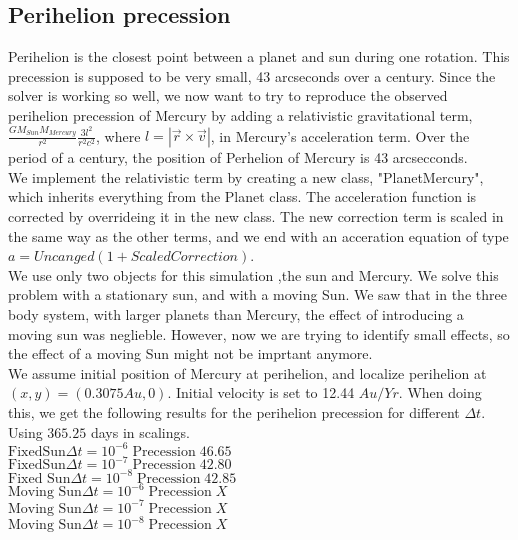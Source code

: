 \documentclass{article}
\begin{document}
\subsection{Perihelion precession}
Perihelion is the closest point between a planet and sun during one rotation. This precession is supposed to be very small, 43 arcseconds over a century. Since the solver is working so well, we now want to try to reproduce the observed perihelion precession of Mercury by adding a relativistic gravitational term,$\frac{GM_{Sun} M_{Mercury}}{r^2} \frac{3l^2}{r^2c^2}$, where $l = |\vec{r} \times \vec{v}|$, in Mercury's acceleration term. Over the period of a century, the position of Perhelion of Mercury is 43 arcsecconds. \\

We implement the relativistic term by creating a new class, "PlanetMercury", which inherits everything from the Planet class. The acceleration function is corrected by overrideing it in the new class. The new correction term is scaled in the same way as the other terms, and we  end with an acceration equation of type $a = Uncanged(1 + ScaledCorrection)$. \\

We use only two objects for this simulation ,the sun and Mercury. We solve this problem with a stationary sun, and with a moving Sun. We saw that in the three body system, with larger planets than Mercury, the effect of introducing a moving sun was neglieble. However, now we are trying to identify small effects, so the effect of a moving Sun might not be imprtant anymore. \\

We assume initial position of Mercury at perihelion, and localize perihelion at $(x,y) = (0.3075 Au, 0)$. Initial velocity is set to 12.44 $Au/Yr$. When doing this, we get the following results for the perihelion precession for different $\Delta t$.\\


Using $365.25$ days in scalings.\\
$\text{FixedSun} \Delta t = 10^{-6}\; \text{Precession}\; 46.65$\\
$\text{FixedSun} \Delta t = 10^{-7}\; \text{Precession}\; 42.80$\\
$\text{Fixed Sun} \Delta t = 10^{-8}\; \text{Precession}\; 42.85$\\

$\text{Moving Sun} \Delta t = 10^{-6}\; \text{Precession}\; X$\\
$\text{Moving Sun} \Delta t = 10^{-7}\; \text{Precession}\; X$\\
$\text{Moving Sun} \Delta t = 10^{-8}\; \text{Precession}\; X$\\
\end{document}
